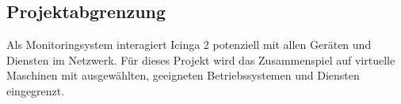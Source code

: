 \subsection{Projektabgrenzung} 
\label{sec:Projektabgrenzung}
Als Monitoringsystem interagiert \glqq Icinga 2\grqq{} potenziell mit allen Geräten und Diensten im Netzwerk. Für dieses Projekt wird das Zusammenspiel auf virtuelle Maschinen mit ausgewählten, geeigneten Betriebssystemen und Diensten eingegrenzt.
